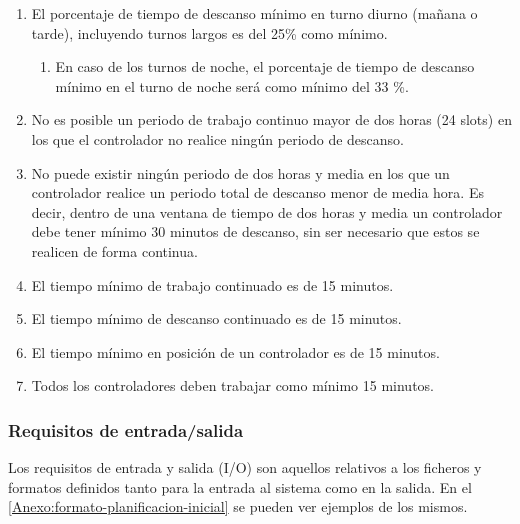 \begin{enumerate}[resume*]
	
	\item \label{RD:3:porcentaje-min-descanso} El porcentaje de tiempo de descanso mínimo en turno diurno (mañana o tarde), incluyendo turnos largos es del 25\% como mínimo.
	\begin{enumerate}[label*={\textbf{.\arabic*}}]
		\item En caso de los turnos de noche, el porcentaje de tiempo de descanso mínimo en el turno de noche será
		como mínimo del 33 \%.
	\end{enumerate}
	
	\item \label{R:5:max-trabajo-continuado} No es posible un periodo de trabajo continuo mayor de dos horas (24 slots) en los que el controlador no realice ningún periodo de descanso.
	
	\item No puede existir ningún periodo de dos horas y media en los que un controlador realice un periodo total de descanso menor de media hora. Es decir, dentro de una ventana de tiempo de dos horas y media un controlador debe tener mínimo 30 minutos de descanso, sin ser necesario que estos se realicen de forma continua.
	
	\item \label{RD:9:tiempo-min-trabajo-continuado} El tiempo mínimo de trabajo continuado es de 15 minutos.
	
	\item \label{RD:9:tiempo-min-descanso-continuado} El tiempo mínimo de descanso continuado es de 15 minutos.
	
	\item El tiempo mínimo en posición de un controlador es de 15 minutos.
	
	\item Todos los controladores deben trabajar como mínimo 15 minutos.
	
\end{enumerate}


\subsubsection{Requisitos de entrada/salida} \label{sec:4:req-io}
Los requisitos de entrada y salida (I/O) son aquellos relativos a los ficheros y formatos definidos tanto para la entrada al sistema como en la salida. En el \autoref{Anexo:formato-planificacion-inicial} se pueden ver ejemplos de los mismos. %

